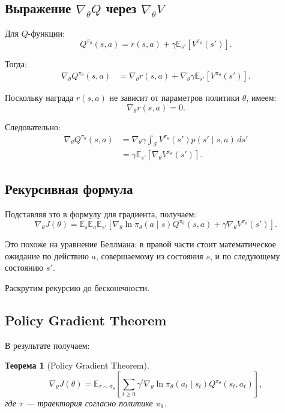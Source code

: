 \documentclass[12pt,a4paper]{article}
\newtheorem{theorem}{Теорема}
\begin{document}
\subsection{Выражение $\nabla_\theta Q$ через $\nabla_\theta V$}

Для $Q$-функции:
\[
Q^{\pi_\theta}(s,a)
=
r(s,a)
+
\gamma
\mathbb E_{s'}
\left[
V^{\pi_\theta}(s')
\right].
\]

Тогда:
\[
\begin{aligned}
\nabla_\theta Q^{\pi_\theta}(s,a)
&=
\nabla_\theta r(s,a)
+
\nabla_\theta
\gamma
\mathbb E_{s'}
\left[
V^{\pi_\theta}(s')
\right].
\end{aligned}
\]

Поскольку награда $r(s,a)$ не зависит от параметров политики $\theta$, имеем:
\[
\nabla_\theta r(s,a)=0.
\]

Следовательно:
\[
\begin{aligned}
\nabla_\theta Q^{\pi_\theta}(s,a)
&=
\nabla_\theta
\gamma
\int_{\mathcal S}
V^{\pi_\theta}(s')
p(s'\mid s,a)
\,ds'
\\
&=
\gamma
\mathbb E_{s'}
\left[
\nabla_\theta V^{\pi_\theta}(s')
\right].
\end{aligned}
\]

\subsection{Рекурсивная формула}

Подставляя это в формулу для градиента, получаем:
\[
\nabla_\theta J(\theta)
=
\mathbb E_s
\mathbb E_a
\mathbb E_{s'}
\left[
\nabla_\theta
\ln \pi_\theta(a\mid s)
Q^{\pi_\theta}(s,a)
+
\gamma
\nabla_\theta V^{\pi_\theta}(s')
\right].
\]

Это похоже на уравнение Беллмана: в правой части стоит математическое ожидание по действию $a$, совершаемому из состояния $s$, и по следующему состоянию $s'$.

Раскрутим рекурсию до бесконечности.

\subsection{Policy Gradient Theorem}

В результате получаем:

\begin{theorem}[Policy Gradient Theorem]
\[
\nabla_\theta J(\theta)
=
\mathbb E_{\tau\sim\pi_\theta}
\left[
\sum_{t\ge 0}
\gamma^t
\nabla_\theta
\ln \pi_\theta(a_t\mid s_t)
Q^{\pi_\theta}(s_t,a_t)
\right],
\]
где $\tau$ --- траектория согласно политике $\pi_\theta$.
\end{theorem}
\end{document}

